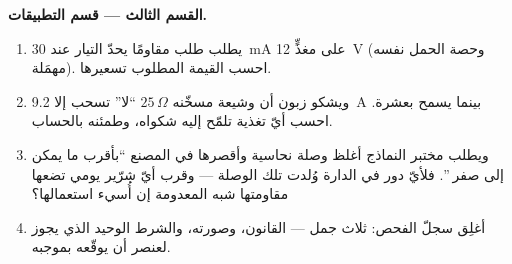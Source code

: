 \begin{problem}
\medskip\noindent\textbf{القسم الثالث --- قسم التطبيقات.}
\begin{enumerate}[resume]
  \item يطلب طلب مقاومًا يحدّ التيار عند \qty{30}{mA} على مغذٍّ
        \qty{12}{V} (وحصة الحمل نفسه مهمَلة). احسب القيمة
        المطلوب تسعيرها.
  \item ويشكو زبون أن وشيعة مسخّنه $25\,\Omega$ ``لا'' تسحب
        إلا \qty{9.2}{A} بينما يسمح  بعشرة. احسب أيّ
         تغذية تلمّح إليه شكواه، وطمئنه بالحساب.
  \item ويطلب مختبر النماذج أغلظ وصلة نحاسية وأقصرها في
        المصنع ``بأقرب ما يمكن إلى صفر ''. فلأيّ دور في
        الدارة وُلدت تلك الوصلة --- وقرب أيّ شرّير يومي تضعها
        مقاومتها شبه المعدومة إن أُسيء استعمالها؟
  \item أغلِق سجلّ الفحص: ثلاث جمل --- القانون، وصورته،
        والشرط الوحيد الذي يجوز لعنصر أن يوقّعه بموجبه.
\end{enumerate}
\end{problem}
